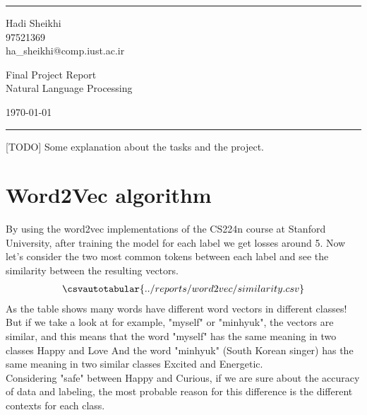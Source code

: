 \documentclass[a4paper]{article}
\begin{document}

\fancyhead[C]{}
\hrule \medskip %
\begin{minipage}{0.295\textwidth} 
\raggedright
\footnotesize
Hadi Sheikhi \hfill\\   
97521369\hfill\\
ha\_sheikhi@comp.iust.ac.ir
\end{minipage}
\begin{minipage}{0.4\textwidth} 
\centering 
\large 
Final Project Report\\ 
\normalsize 
Natural Language Processing\\ 
\end{minipage}
\begin{minipage}{0.295\textwidth} 
\raggedleft
\today\hfill\\
\end{minipage}
\medskip\hrule 
\bigskip



[TODO] Some explanation about the tasks and the project.
\section{Word2Vec algorithm}
By using the word2vec implementations of the CS224n course at Stanford University, after training the model for each label we get losses around 5. Now let's consider the two most common tokens between each label and see the similarity between the resulting vectors.\\
\begin{align*}
	\csvautotabular{../reports/word2vec/similarity.csv}
\end{align*} 
As the table shows many words have different word vectors in different classes! But if we take a look at for example, "myself" or "minhyuk", the vectors are similar, and this means that the word "myself" has the same meaning in two classes Happy and Love And the word "minhyuk" (South Korean singer) has the same meaning in two similar classes Excited and Energetic. \\
Considering "safe" between Happy and Curious, if we are sure about the accuracy of data and labeling, the most probable reason for this difference is the different contexts for each class. 

\bigskip

\end{document}
